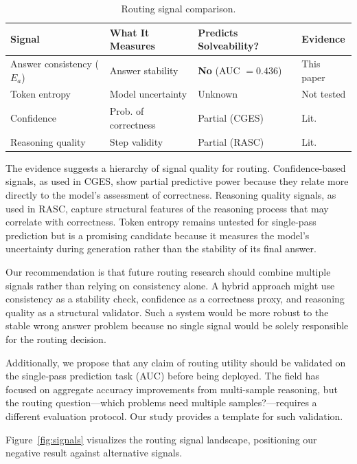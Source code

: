 \documentclass{article}
\begin{document}
\begin{table}[t]
\caption{Routing signal comparison.}
\label{tab:signals}
\centering
\small
\begin{tabular}{@{}p{2.8cm}p{2.6cm}p{3.0cm}p{3.6cm}@{}}
\toprule
Signal & What It Measures & Predicts Solveability? & Evidence \\
\midrule
Answer consistency ($E_a$) & Answer stability & \textbf{No} (AUC $= 0.436$) & This paper \\
Token entropy & Model uncertainty & Unknown & Not tested \\
Confidence & Prob. of correctness & Partial (CGES) & Lit. \citep{aghazadeh2023cges} \\
Reasoning quality & Step validity & Partial (RASC) & Lit. \citep{wan2024rasc} \\
\bottomrule
\end{tabular}
\end{table}

The evidence suggests a hierarchy of signal quality for routing. Confidence-based signals, as used in CGES, show partial predictive power because they relate more directly to the model's assessment of correctness. Reasoning quality signals, as used in RASC, capture structural features of the reasoning process that may correlate with correctness. Token entropy remains untested for single-pass prediction but is a promising candidate because it measures the model's uncertainty during generation rather than the stability of its final answer.

Our recommendation is that future routing research should combine multiple signals rather than relying on consistency alone. A hybrid approach might use consistency as a stability check, confidence as a correctness proxy, and reasoning quality as a structural validator. Such a system would be more robust to the stable wrong answer problem because no single signal would be solely responsible for the routing decision.

Additionally, we propose that any claim of routing utility should be validated on the single-pass prediction task (AUC) before being deployed. The field has focused on aggregate accuracy improvements from multi-sample reasoning, but the routing question---which problems need multiple samples?---requires a different evaluation protocol. Our study provides a template for such validation.

Figure~\ref{fig:signals} visualizes the routing signal landscape, positioning our negative result against alternative signals.
\end{document}
